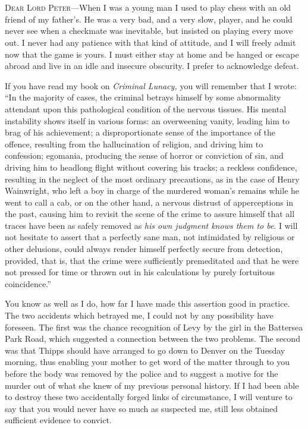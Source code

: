 \chapter[Chapter \thechapter]{}
\lettrine[lines=4]{D}{ear} \textsc{Lord Peter}\allowbreak---\allowbreak When I was a young man I used to play chess with an old friend of my father’s. He was a very bad, and a very slow, player, and he could never see when a checkmate was inevitable, but insisted on playing every move out. I never had any patience with that kind of attitude, and I will freely admit now that the game is yours. I must either stay at home and be hanged or escape abroad and live in an idle and insecure obscurity. I prefer to acknowledge defeat.

If you have read my book on \textit{Criminal Lunacy,} you will remember that I wrote: \enquote{In the majority of cases, the criminal betrays himself by some abnormality attendant upon this pathological condition of the nervous tissues. His mental instability shows itself in various forms: an overweening vanity, leading him to brag of his achievement; a disproportionate sense of the importance of the offence, resulting from the hallucination of religion, and driving him to confession; egomania, producing the sense of horror or conviction of sin, and driving him to headlong flight without covering his tracks; a reckless confidence, resulting in the neglect of the most ordinary precautions, as in the case of Henry Wainwright, who left a boy in charge of the murdered woman’s remains while he went to call a cab, or on the other hand, a nervous distrust of apperceptions in the past, causing him to revisit the scene of the crime to assure himself that all traces have been as safely removed as \textit{his own judgment knows them to be}. I will not hesitate to assert that a perfectly sane man, not intimidated by religious or other delusions, could always render himself perfectly secure from detection, provided, that is, that the crime were sufficiently premeditated and that he were not pressed for time or thrown out in his calculations by purely fortuitous coincidence.}

You know as well as I do, how far I have made this assertion good in practice. The two accidents which betrayed me, I could not by any possibility have foreseen. The first was the chance recognition of Levy by the girl in the Battersea Park Road, which suggested a connection between the two problems. The second was that Thipps should have arranged to go down to Denver on the Tuesday morning, thus enabling your mother to get word of the matter through to you before the body was removed by the police and to suggest a motive for the murder out of what she knew of my previous personal history. If I had been able to destroy these two accidentally forged links of circumstance, I will venture to say that you would never have so much as suspected me, still less obtained sufficient evidence to convict.

